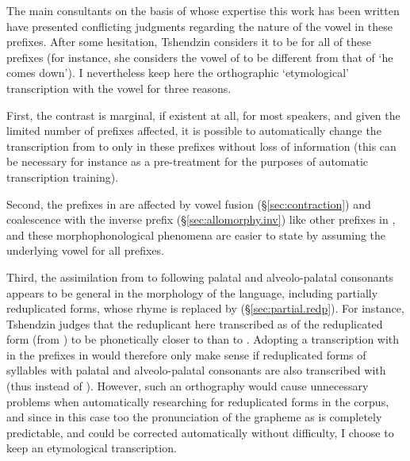 The main consultants on the basis of whose expertise this work has been written have presented conflicting judgments regarding the nature of the vowel in these prefixes. After some hesitation, Tshendzin considers it to be  for all of these prefixes (for instance, she considers the vowel of  to be different from that of  `he comes down'). I nevertheless keep here the orthographic `etymological' transcription with the vowel  for three reasons.

First, the contrast is marginal, if existent at all, for most speakers, and given the limited number of prefixes affected, it is possible to automatically change the transcription from  to  only in these prefixes without loss of information (this can be necessary for instance as a pre-treatment for the purposes of automatic transcription training). 

Second, the prefixes in  are affected by vowel fusion (§\ref{sec:contraction}) and coalescence with the inverse prefix  (§\ref{sec:allomorphy.inv}) like other prefixes in , and these morphophonological phenomena are easier to state by assuming the underlying vowel  for all prefixes. 

Third, the assimilation from  to  following palatal and alveolo-palatal consonants appears to be general in the morphology of the language, including partially reduplicated forms, whose rhyme is replaced by  (§\ref{sec:partial.redp}). For instance, Tshendzin judges that the reduplicant here transcribed as  of the reduplicated form  (from ) to be phonetically closer to  than to . Adopting a transcription with  in the prefixes in  would therefore only make sense if reduplicated forms of syllables with palatal and alveolo-palatal consonants are also transcribed with  (thus  instead of ). However, such an orthography would cause unnecessary problems when automatically researching for reduplicated forms in the corpus, and since in this case too the pronunciation of the grapheme  as  is completely predictable, and could be corrected automatically without difficulty, I choose to keep an etymological transcription. 

